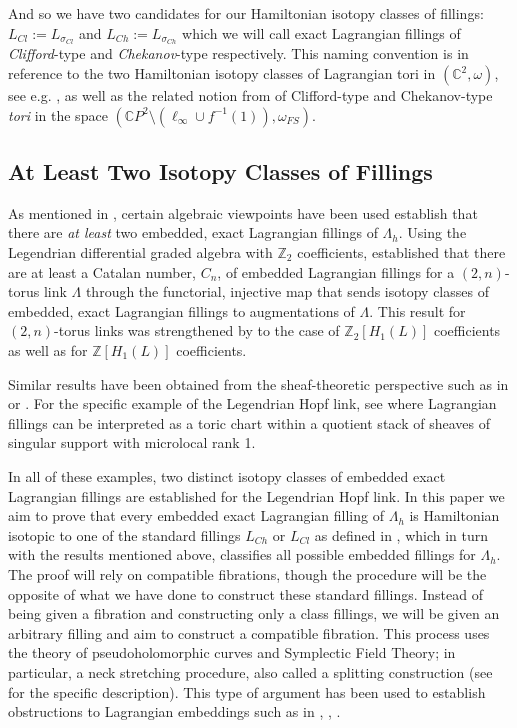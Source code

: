\documentclass[10pt]{amsart}
\theoremstyle{plain}
\theoremstyle{definition}
\numberwithin{equation}{section}
\newcommand{\Z}{\mathbb{Z}}
\newcommand{\C}{\mathbb{C}}
\newcommand{\La}{\Lambda}
\newcommand{\sm}{\setminus}
\begin{document}
And so we have two candidates for our Hamiltonian isotopy classes of fillings: $L_{Cl}:=L_{\sigma_{Cl}}$ and $L_{Ch}:=L_{\sigma_{Ch}}$ which we will call exact Lagrangian fillings of \textit{Clifford}-type and \textit{Chekanov}-type respectively. This naming convention is in reference to the two Hamiltonian isotopy classes of Lagrangian tori in $(\C^2,\omega)$, see e.g. \cite{Chekanov96_LagrangianTori}, as well as the related notion from \cite{DR19_WhitneySphere} of Clifford-type and Chekanov-type \textit{tori} in the space $(\C P^2\sm (\ell_\infty \cup f^{-1}(1)),\omega_{FS})$.

\subsection{At Least Two Isotopy Classes of Fillings}\label{sec:sheafClassification}
As mentioned in , certain algebraic viewpoints have been used establish that there are \textit{at least} two embedded, exact Lagrangian fillings of $\Lambda_h$. Using the Legendrian differential graded algebra \cite{Chekanov97_LDGA} with $\Z_2$ coefficients, \cite[Section 8]{Ekholm12_LagrangianCobord} established that there are at least a Catalan number, $C_n$, of embedded Lagrangian fillings for a $(2,n)$-torus link $\La$ through the functorial, injective map that sends isotopy classes of embedded, exact Lagrangian fillings to augmentations of $\Lambda$. This result for $(2,n)$-torus links was strengthened by \cite{Pan17_ExactLagrFillings} to the case of $\Z_2[H_1(L)]$ coefficients as well as \cite{Casals22_braidloopsinfinitemonodromy} for $\Z[H_1(L)]$ coefficients.

Similar results have been obtained from the sheaf-theoretic perspective such as in \cite{STZ16_LegKnotsandSheaves} or \cite{Casals22_LegWeaves}. For the specific example of the Legendrian Hopf link, see \cite[Examples 2.5.2 and 2.5.3]{Casals24_Microlocal} where Lagrangian fillings can be interpreted as a toric chart within a
quotient stack of sheaves of singular support with microlocal rank 1. 

In all of these examples, two distinct isotopy classes of embedded exact Lagrangian fillings are established for the Legendrian Hopf link. In this paper we aim to prove that every embedded exact Lagrangian filling of $\La_h$ is Hamiltonian isotopic to one of the standard fillings $L_{Ch}$ or $L_{Cl}$ as defined in , which in turn with the results mentioned above, classifies all possible embedded fillings for $\La_h$. The proof will rely on compatible fibrations, though the procedure will be the opposite of what we have done to construct these standard fillings. Instead of being given a fibration and constructing only a class fillings, we will be given an arbitrary filling and aim to construct a compatible fibration. This process uses the theory of pseudoholomorphic curves and Symplectic Field Theory; in particular, a neck stretching procedure, also called a splitting construction (see  for the specific description). This type of argument has been used to establish obstructions to Lagrangian embeddings such as in \cite[Theorem 1.7.5]{EGH00_SFT}, \cite{Hind04_LagrSpheresS2xS2}, \cite{Hind14_Polydisks}.
\end{document}
